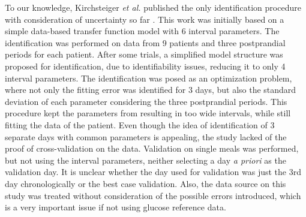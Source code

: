 To our knowledge, Kirchsteiger \textit{et al.} published the only identification procedure with consideration of uncertainty so far \cite{kirchsteiger2011estimating}. This work was initially based on a simple data-based transfer function model with 6 interval parameters. The identification was performed on data from 9 patients and three postprandial periods for each patient. After some trials, a simplified model structure was proposed for identification, due to identifiability issues, reducing it to only 4 interval parameters. The identification was posed as an optimization problem, where not only the fitting error was identified for 3 days, but also the standard deviation of each parameter considering the three postprandial periods. This procedure kept the parameters from resulting in too wide intervals, while still fitting the data of the patient. Even though the idea of identification of 3 separate days with common parameters is appealing, the study lacked of the proof of cross-validation on the data. Validation on single meals was performed, but not using the interval parameters, neither selecting a day \textit{a priori} as the validation day. It is unclear whether the day used for validation was just the 3rd day chronologically or the best case validation. Also, the data source on this study was treated without consideration of the possible errors introduced, which is a very important issue if not using glucose reference data.




